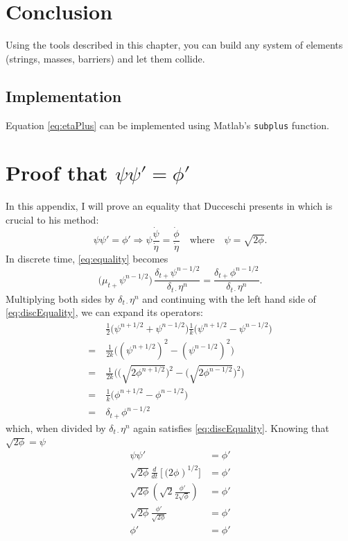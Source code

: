 \documentclass{article}
\begin{document}
\section{Conclusion}
Using the tools described in this chapter, you can build any system of elements (strings, masses, barriers) and let them collide.
\subsection{Implementation}
Equation \eqref{eq:etaPlus} can be implemented using Matlab's \texttt{subplus} function.



\appendix
\section{Proof that $\psi\psi' = \phi'$}\label{app:phiPsiProof}
In this appendix, I will prove an equality that Ducceschi presents in \cite{Ducceschi2019} which is crucial to his method:
\begin{equation}\label{eq:equality}
    \psi\psi' = \phi' \Rightarrow \psi\frac{\dot{\psi}}{\dot{\eta}} = \frac{\dot{\phi}}{\dot\eta}\quad \text{where}\quad \psi = \sqrt{2\phi}.
\end{equation}
In discrete time, \eqref{eq:equality} becomes
\begin{equation}\label{eq:discEquality}
    \big(\mu_{t+}\psi^{n-1/2}\big)\,\frac{\delta_{t+}\psi^{n-1/2}}{\delta_{t\cdot}\eta^n} = \frac{\delta_{t+}\phi^{n-1/2}}{\delta_{t\cdot}\eta^n}. 
\end{equation}
Multiplying both sides by $\delta_{t\cdot} \eta^n$ and continuing with the left hand side of \eqref{eq:discEquality}, we can expand its operators:
\begin{equation}
    \begin{aligned}\nonumber
        &\frac{1}{2}\big(\psi^{n+1/2}+\psi^{n-1/2}\big)\frac{1}{k}\big(\psi^{n+1/2}-\psi^{n-1/2}\big) \\
        =\ &\frac{1}{2k}\Big((\psi^{n+1/2})^2 - (\psi^{n-1/2})^2\Big)\\
        =\ &\frac{1}{2k}\bigg(\Big(\sqrt{2\phi^{n+1/2}}\Big)^2 - \Big(\sqrt{2\phi^{n-1/2}}\Big)^2\bigg)\\
        =\ &\frac{1}{k}\Big(\phi^{n+1/2} - \phi^{n-1/2}\Big)\\
        =\ &\delta_{t+}\phi^{n-1/2}
    \end{aligned}
\end{equation}
which, when divided by $\delta_{t\cdot}\eta^n$ again satisfies \eqref{eq:discEquality}.
Knowing that $\sqrt{2\phi}=\psi$
\begin{equation}
    \begin{aligned}
        \psi\psi' &= \phi'\\
        \sqrt{2\phi}\frac{d}{dt}\left[(2\phi\right)^{1/2}] &= \phi'\\
        \sqrt{2\phi}\left(\sqrt{2}\frac{\phi'}{2\sqrt{\phi}}\right) &= \phi'\\
        \sqrt{2\phi}\frac{\phi'}{\sqrt{2\phi}} &= \phi'\\
        \phi' &= \phi'
    \end{aligned}
\end{equation}
\end{document}
